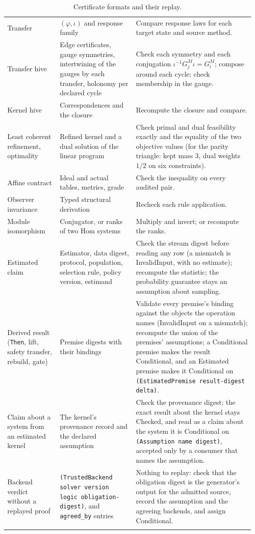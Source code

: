 \documentclass[11pt]{article}
\newcommand{\code}[1]{\texttt{#1}}
\begin{document}
\begin{longtable}{>{\raggedright\arraybackslash}p{3.4cm}>{\raggedright\arraybackslash}p{5.0cm}>{\raggedright\arraybackslash}p{5.4cm}}
Transfer & $(\varphi,\iota)$ and response family & Compare response laws for each target state and source method.\\
Transfer hive & Edge certificates, gauge symmetries, intertwining of the gauges by each transfer, holonomy per declared cycle & Check each symmetry and each conjugation $\iota^{-1}G^M_j\iota=G^M_i$; compose around each cycle; check membership in the gauge.\\
Kernel hive & Correspondences and the closure & Recompute the closure and compare.\\
Least coherent refinement, optimality & Refined kernel and a dual solution of the linear program & Check primal and dual feasibility exactly and the equality of the two objective values (for the parity triangle: kept mass $3$, dual weights $1/2$ on six constraints).\\
Affine contract & Ideal and actual tables, metrics, grade & Check the inequality on every audited pair.\\
Observer invariance & Typed structural derivation & Recheck each rule application.\\
Module isomorphism & Conjugator, or ranks of two Hom systems & Multiply and invert; or recompute the ranks.\\
Estimated claim & Estimator, data digest, protocol, population, selection rule, policy version, estimand & Check the stream digest before reading any row (a mismatch is InvalidInput, with no estimate); recompute the statistic; the probability guarantee stays an assumption about sampling.\\
Derived result (\code{Then}, lift, safety transfer, rebuild, gate) & Premise digests with their bindings & Validate every premise's binding against the objects the operation names (InvalidInput on a mismatch); recompute the union of the premises' assumptions; a Conditional premise makes the result Conditional, and an Estimated premise makes it Conditional on \code{(EstimatedPremise result-digest delta)}.\\
Claim about a system from an estimated kernel & The kernel's provenance record and the declared assumption & Check the provenance digest; the exact result about the kernel stays Checked, and read as a claim about the system it is Conditional on \code{(Assumption name digest)}, accepted only by a consumer that names the assumption.\\
Backend verdict without a replayed proof & \code{(TrustedBackend solver version logic obligation-digest)}, and \code{agreed\_by} entries & Nothing to replay: check that the obligation digest is the generator's output for the admitted source, record the assumption and the agreeing backends, and assign Conditional.\\
\bottomrule
\caption{Certificate formats and their replay.}\label{tab:certs}
\end{longtable}
\end{document}

